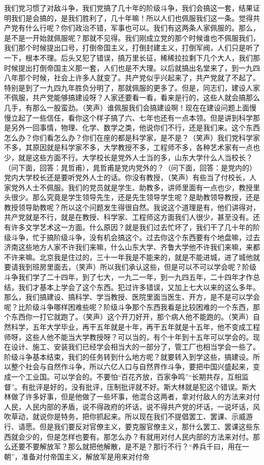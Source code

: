 我们党习惯了对敌斗争，我们党搞了几十年的阶级斗争，我们会搞这一套，结果证明我们是会搞的，是我们胜利了，几十年嘛！所以人们也佩服我们这一条。觉得共产党有什么行呢？你们政治不错，军事也可以。我们有这两条人家佩服的。那么，是不是一开始就佩服呢？那就不见得。我们刚成立党的那个时候谁也不佩服我们，我们那个时候提出口号，打倒帝国主义，打倒封建主义，打倒军阀，人们只是听了一下，根本不理。后头又犯了错误，搞万里长征，稀稀拉拉剩下几个大人，我们那时候提出打倒帝国主义那一套，人们也是不大理。以后就搞出名堂来了，到一九四八年那个时候，社会上许多人就变了。共产党似乎兴起来了，共产党就了不起了。特别是到了一九四九年胜负分明了，那就佩服的更多了。但是，同志们，建设人家不佩服，共产党能够搞建设呀？人家还要看一看，看来是行的，这些人就会搞那么几手，有那么一股蛮劲。（笑声）谁佩服我们会搞建设啊！现在在建设问题上面慢慢立起了一些信任，看你这个样子搞了六、七年也还有一点本领。但是讲到科学那是另外一回事情，物理、化学、数学之类，他说你们不行，还是我们来。这个东西怎么办？你们看怎么办？你们在座的都是科学家，是不是？（笑声）我们党科学家不多，其原因就是科学家不多，大学教授不多，工程师不多，各种艺术家有一点也少，就是这些方面不行。大学校长是党外人士当的多，山东大学什么人当校长？（问下面，回答：晁哲甫），晁哲甫是党内党外的？（问下面，回答：是党内的）党内大学校长还是要听党外人士的话。你没有教授，（笑声）有些当了付校长，人家党外人士不佩服。我们的党员就是学生、助教多，讲师里面有一点也少，教授里头很少。那么究竟是学生领导先生，还是先生领导学生呢？是助教领导教授，还是教授领导助教呢？所以这个问题发生得很自然。我说这个道理是有，他们讲得对，共产党就是不行，就是在教授、科学家、工程师这方面我们人很少，甚至没有。还有许多文学艺术这一方面。什么原因？就是我们过去忙坏了，我们干了几十年的阶级斗争，忙于搞阶级斗争，没有机会搞这个。过去你这个东西要有个地盘嘛，过去济南这些地方人家不许我们来嘛，什么山东大学、齐鲁大学他不许我们来嘛，来都不许来嘛。北京我是住过的，三十一年我是不能来的，就是不能进城，进了城他就要请我到班房里面去，（笑声）所以我们承认这些，但是可以不可以学会呢？阶级斗争我们学了二十四年，到了七大，一九二一年，到一九四五年，二十四年才作总结，我们才基本上学会了这个东西。犯过许多错误，又加上七大以来的这么多年。那么，我们搞建设、搞科学、学当教授、医院里面当医生、开方，是不是可以学会呢？比阶级斗争哪样困难些呢？阶级斗争那个东西我看是比较困难的一个东西，那个东西你一打它就跑了。（笑声）这个开刀好开，那个病人他不能跑的。（笑声）自然科学，五年大学毕业，再干五年就是十年，再干五年就是十五年，他不变成工程师呀，这些人他不能当大学教授呀？可以当的，有个十年到十五年可以学会的。现在设计、施工、安装我们已经学会相当大的一部分了，管工厂也相当学会一些了。阶级斗争基本结束，我们的任务转到什么地方呢？就要转入到学这些，搞建设。所以整个社会与自然作斗争，所以六亿人口与自然界作斗争，要把中国兴盛起来，变成一个工业国。可以学会的。不要怕“百花齐放，百家争鸣”“长期共存，互相监督”。有批评是好的，没有批评，压制批评就不好。斯大林就是犯这个错误。斯大林做了许多好事，但是他做了一些坏事，他混合这两者，拿对付敌人的方法来对付人民，人民内部的矛盾，说不得政府的坏话，说不得共产党的坏话，一说坏话，风吹草动，就说你是特务，把你抓起来。所以现在我们不提倡罢工、罢课、示威游行、请愿。但是我们要反对官僚主义，要克服官僚主义，那什么罢工、罢课这些东西就会少的，但是怎样也要有。那怎么办？有就用对付人民内部的方法来对付。那么还要不要解放军？那么就把他解散，是不是？那行不行？“养兵千曰，用在一朝”，准备对付帝国主义，解放军是用来对付帝